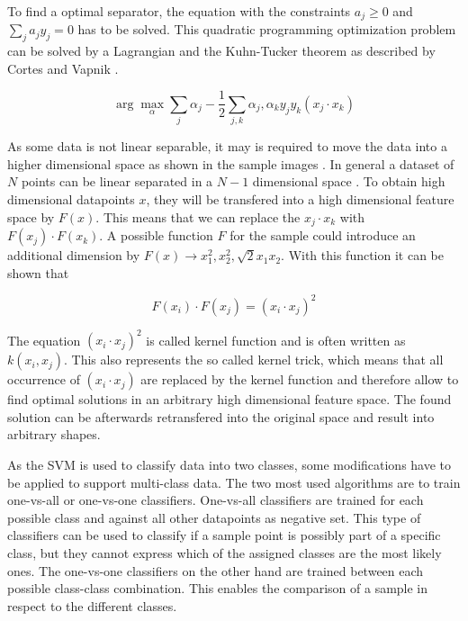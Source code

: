 To find a optimal separator, the equation  with the constraints $a_j \ge 0$ and $\sum_j a_j y_j = 0$ has to be solved. This quadratic programming optimization problem can be solved by a Lagrangian and the Kuhn-Tucker theorem as described by Cortes and Vapnik \cite{cortes1995support}.

\begin{equation}
\arg\max_\alpha \sum_j \alpha_j - \frac{1}{2} \sum_{j,k} \alpha_j, \alpha_k y_j y_k (x_j \cdot x_k)
\label{eqn:svm:maxmarg}
\end{equation}

As some data is not linear separable, it may is required to move the data into a higher dimensional space as shown in the sample images . In general a dataset of $N$ points can be linear separated in a $N-1$ dimensional space \cite{russellnorvig-ai}.
To obtain high dimensional datapoints $x$, they will be transfered into a high dimensional feature space by $F(x)$. This means that we can replace the $x_j \cdot x_k$ with $F(x_j) \cdot F(x_k)$. A possible function $F$ for the sample could introduce an additional dimension by $F(x) \rightarrow x_1^2, x_2^2, \sqrt{2} x_1 x_2$. With this function it can be shown that

\begin{equation}
F(x_i) \cdot F(x_j) = (x_i \cdot x_j)^2
\end{equation}

The equation $(x_i \cdot x_j)^2$ is called kernel function and is often written as $k(x_i, x_j)$. This also represents the so called kernel trick, which means that all occurrence of $(x_i \cdot x_j)$ are replaced by the kernel function and therefore allow to find optimal solutions in an arbitrary high dimensional feature space. The found solution can be afterwards retransfered into the original space and result into arbitrary shapes.

As the \ac{SVM} is used to classify data into two classes, some modifications have to be applied to support multi-class data. The two most used algorithms are to train one-vs-all or one-vs-one classifiers. One-vs-all classifiers are trained for each possible class and against all other datapoints as negative set. This type of classifiers can be used to classify if a sample point is possibly part of a specific class, but they cannot express which of the assigned classes are the most likely ones. The one-vs-one classifiers on the other hand are trained between each possible class-class combination. This enables the comparison of a sample in respect to the different classes.

